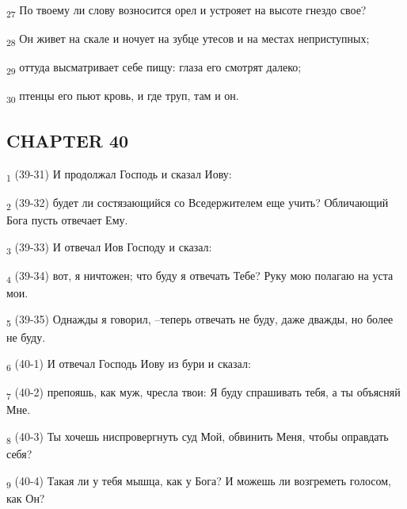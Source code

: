 \begin{tcolorbox}
\textsubscript{27} По твоему ли слову возносится орел и устрояет на высоте гнездо свое?
\end{tcolorbox}
\begin{tcolorbox}
\textsubscript{28} Он живет на скале и ночует на зубце утесов и на местах неприступных;
\end{tcolorbox}
\begin{tcolorbox}
\textsubscript{29} оттуда высматривает себе пищу: глаза его смотрят далеко;
\end{tcolorbox}
\begin{tcolorbox}
\textsubscript{30} птенцы его пьют кровь, и где труп, там и он.
\end{tcolorbox}
\subsection{CHAPTER 40}
\begin{tcolorbox}
\textsubscript{1} (39-31) И продолжал Господь и сказал Иову:
\end{tcolorbox}
\begin{tcolorbox}
\textsubscript{2} (39-32) будет ли состязающийся со Вседержителем еще учить? Обличающий Бога пусть отвечает Ему.
\end{tcolorbox}
\begin{tcolorbox}
\textsubscript{3} (39-33) И отвечал Иов Господу и сказал:
\end{tcolorbox}
\begin{tcolorbox}
\textsubscript{4} (39-34) вот, я ничтожен; что буду я отвечать Тебе? Руку мою полагаю на уста мои.
\end{tcolorbox}
\begin{tcolorbox}
\textsubscript{5} (39-35) Однажды я говорил, --теперь отвечать не буду, даже дважды, но более не буду.
\end{tcolorbox}
\begin{tcolorbox}
\textsubscript{6} (40-1) И отвечал Господь Иову из бури и сказал:
\end{tcolorbox}
\begin{tcolorbox}
\textsubscript{7} (40-2) препояшь, как муж, чресла твои: Я буду спрашивать тебя, а ты объясняй Мне.
\end{tcolorbox}
\begin{tcolorbox}
\textsubscript{8} (40-3) Ты хочешь ниспровергнуть суд Мой, обвинить Меня, чтобы оправдать себя?
\end{tcolorbox}
\begin{tcolorbox}
\textsubscript{9} (40-4) Такая ли у тебя мышца, как у Бога? И можешь ли возгреметь голосом, как Он?
\end{tcolorbox}
